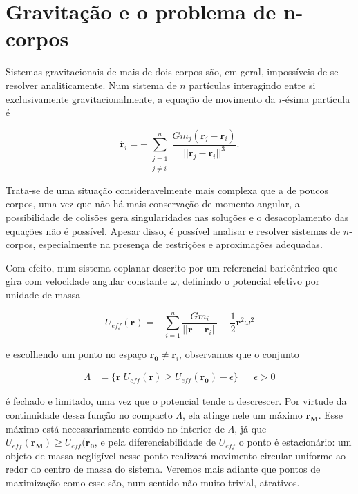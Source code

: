 \section{Gravitação e o problema de n-corpos}


Sistemas gravitacionais de mais de dois corpos são, em geral, impossíveis de se resolver analiticamente. Num sistema de $n$ partículas interagindo entre si exclusivamente gravitacionalmente, a equação de movimento da $i$-ésima partícula é 

\begin{equation}
    \ddot{\mathbf{r}}_i=-\sum_{\substack{j=1\\j \neq i}}^{n} \frac{Gm_j(\mathbf{r}_j - \mathbf{r}_i)}{||\mathbf{r}_j - \mathbf{r}_i||^3}.
\end{equation} 

Trata-se de uma situação consideravelmente mais complexa que a de poucos corpos, uma vez que não há mais conservação de momento angular, a possibilidade de colisões gera singularidades nas soluções e o desacoplamento das equações não é possível. Apesar disso, é possível analisar e resolver sistemas de $n$-corpos, especialmente na presença de restrições e aproximações adequadas.

Com efeito, num sistema coplanar descrito por um referencial baricêntrico que gira com velocidade angular constante $\omega$, definindo o potencial efetivo por unidade de massa

\begin{equation}
    U_{eff}(\mathbf{r}) = -\sum_{i = 1}^n \frac{Gm_i}{||\mathbf{r} - \mathbf{r}_i||} - \frac{1}{2}\mathbf{r}^2\omega^2
\end{equation}

e escolhendo um ponto no espaço $\mathbf{r_0} \neq \mathbf{r}_i$, observamos que o conjunto

\begin{align} 
    \Lambda &= \{\mathbf{r} | U_{eff}(\mathbf{r}) \geq U_{eff}(\mathbf{r_0}) - \epsilon\} && \epsilon > 0
\end{align}

é fechado e limitado, uma vez que o potencial tende a descrescer. Por virtude da continuidade dessa função no compacto $\Lambda$, ela atinge nele um máximo $\mathbf{r_M}$. Esse máximo está necessariamente contido no interior de $\Lambda$, já que $U_{eff}(\mathbf{r_M}) \geq U_{eff}(\mathbf{r_0}$, e pela diferenciabilidade de $U_{eff}$ o ponto é estacionário: um objeto de massa negligível nesse ponto realizará movimento circular uniforme ao redor do centro de massa do sistema. Veremos mais adiante que pontos de maximização como esse são, num sentido não muito trivial, atrativos.

